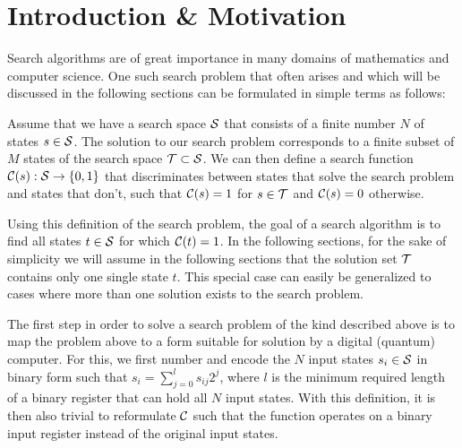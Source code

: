 \section{Introduction \& Motivation}

Search algorithms are of great importance in many domains of mathematics and computer science. One such search problem that often arises and which will be discussed in the following sections can be formulated in simple terms as follows:

\begin{theorem}
Assume that we have a search space $\begin{mathcal}S\end{mathcal}$ that consists of a finite number $N$ of states $s \in \begin{mathcal}S\end{mathcal}$. The solution to our search problem corresponds to a finite subset of $M$ states of the search space $\begin{mathcal}T\end{mathcal} \subset \begin{mathcal}S\end{mathcal}$. We can then define a search function $\Or(s):\begin{mathcal}S\end{mathcal}\to \{0,1\}$ that discriminates between states that solve the search problem and states that don't, such that $\Or(s) = 1$ for $s \in \begin{mathcal}T\end{mathcal}$ and $\Or(s) = 0$ otherwise.
\end{theorem}

Using this definition of the search problem, the goal of a search algorithm is to find all states $t\in\begin{mathcal}S\end{mathcal}$ for which $\Or(t) = 1$. In the following sections, for the sake of simplicity we will assume in the following sections that the solution set $\begin{mathcal}T\end{mathcal}$ contains only one single state $t$. This special case can easily be generalized to cases where more than one solution exists to the search problem.

\smallskip

The first step in order to solve a search problem of the kind described above is to map the problem above to a form suitable for solution by a digital (quantum) computer. For this, we first number and encode the $N$ input states $s_i \in \begin{mathcal}S\end{mathcal}$ in binary form such that $s_i = \sum\limits_{j=0}^l s_{ij}2^j $, where $l$ is the minimum required length of a binary register that can hold all $N$ input states. With this definition, it is then also trivial to reformulate $\Or$ such that the function operates on a binary input register instead of the original input states. 

